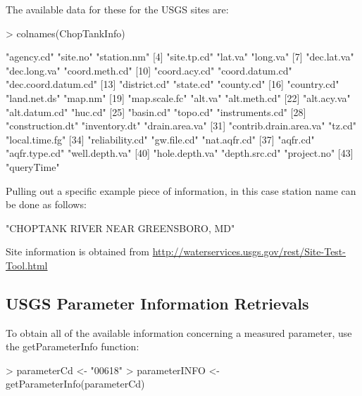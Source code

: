 \documentclass[a4paper,11pt]{article}
\begin{document}
The available data for these for the USGS sites are:
\begin{Schunk}
\begin{Sinput}
> colnames(ChopTankInfo)
\end{Sinput}
\begin{Soutput}
 [1] "agency.cd"             "site.no"               "station.nm"           
 [4] "site.tp.cd"            "lat.va"                "long.va"              
 [7] "dec.lat.va"            "dec.long.va"           "coord.meth.cd"        
[10] "coord.acy.cd"          "coord.datum.cd"        "dec.coord.datum.cd"   
[13] "district.cd"           "state.cd"              "county.cd"            
[16] "country.cd"            "land.net.ds"           "map.nm"               
[19] "map.scale.fc"          "alt.va"                "alt.meth.cd"          
[22] "alt.acy.va"            "alt.datum.cd"          "huc.cd"               
[25] "basin.cd"              "topo.cd"               "instruments.cd"       
[28] "construction.dt"       "inventory.dt"          "drain.area.va"        
[31] "contrib.drain.area.va" "tz.cd"                 "local.time.fg"        
[34] "reliability.cd"        "gw.file.cd"            "nat.aqfr.cd"          
[37] "aqfr.cd"               "aqfr.type.cd"          "well.depth.va"        
[40] "hole.depth.va"         "depth.src.cd"          "project.no"           
[43] "queryTime"            
\end{Soutput}
\end{Schunk}
Pulling out a specific example piece of information, in this case station name can be done as follows:
\begin{Schunk}
\begin{Soutput}
[1] "CHOPTANK RIVER NEAR GREENSBORO, MD"
\end{Soutput}
\end{Schunk}
Site information is obtained from \url{http://waterservices.usgs.gov/rest/Site-Test-Tool.html}

\subsection{USGS Parameter Information Retrievals}
To obtain all of the available information concerning a measured parameter, use the getParameterInfo function:
\begin{Schunk}
\begin{Sinput}
> parameterCd <- "00618"
> parameterINFO <- getParameterInfo(parameterCd)
\end{Sinput}
\end{Schunk}
\end{document}

